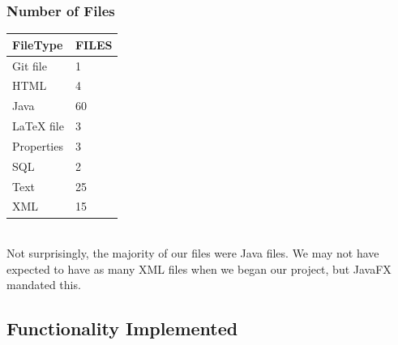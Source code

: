 \documentclass[twoside,letterpaper]{article}
\begin{document}
\subsubsection{Number of Files}
\begin{tabular}{|l|l|}
\hline
FileType   & FILES \\ \hline
Git file   & 1     \\ \hline
HTML       & 4     \\ \hline
Java       & 60    \\ \hline
LaTeX file & 3     \\ \hline
Properties & 3     \\ \hline
SQL        & 2     \\ \hline
Text       & 25    \\ \hline
XML        & 15    \\ \hline
\end{tabular}
\\ \noindent Not surprisingly, the majority of our files were Java files. We may not have expected to have as many XML files when we began our project, but JavaFX mandated this.\\
\newpage
\;
\subsection{Functionality Implemented}
\end{document}
